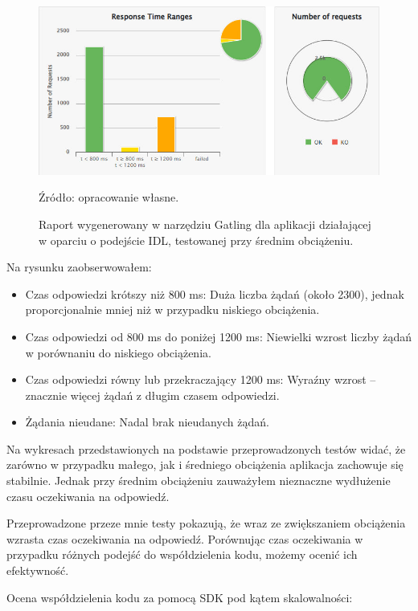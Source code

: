 \documentclass[runningheads,12pt]{llncs}
\begin{document}
\begin{figure}
    \includegraphics[width=\linewidth]{images/idl-midle-gatling-graph.jpg}
    \caption{Raport wygenerowany w narzędziu Gatling dla aplikacji działającej w oparciu o podejście IDL, testowanej przy średnim obciążeniu.} \label{fig1}
    \vspace{0.5em}
    {\small Źródło: opracowanie własne.}
\end{figure}

Na rysunku zaobserwowałem:

\begin{itemize}
    \item Czas odpowiedzi krótszy niż 800 ms: Duża liczba żądań (około 2300), jednak proporcjonalnie mniej niż w przypadku niskiego obciążenia.
    \item Czas odpowiedzi od 800 ms do poniżej 1200 ms: Niewielki wzrost liczby żądań w porównaniu do niskiego obciążenia.
    \item Czas odpowiedzi równy lub przekraczający 1200 ms: Wyraźny wzrost – znacznie więcej żądań z długim czasem odpowiedzi.
    \item Żądania nieudane: Nadal brak nieudanych żądań.
\end{itemize}

Na wykresach przedstawionych na podstawie przeprowadzonych testów widać, że zarówno w przypadku małego, jak i średniego obciążenia aplikacja zachowuje się stabilnie. Jednak przy średnim obciążeniu zauważyłem nieznaczne wydłużenie czasu oczekiwania na odpowiedź.

\newpage

Przeprowadzone przeze mnie testy pokazują, że wraz ze zwiększaniem obciążenia wzrasta czas oczekiwania na odpowiedź. Porównując czas oczekiwania w przypadku różnych podejść do współdzielenia kodu, możemy ocenić ich efektywność.

Ocena współdzielenia kodu za pomocą SDK pod kątem skalowalności:
\end{document}
